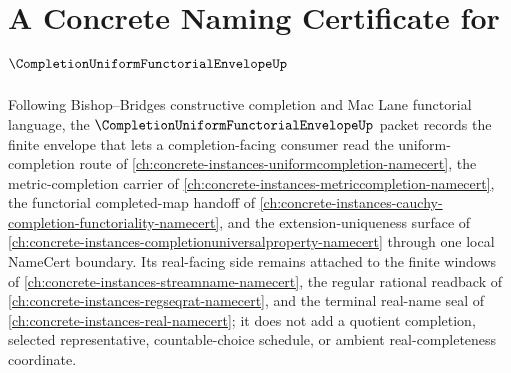 \chapter{A Concrete Naming Certificate for $\CompletionUniformFunctorialEnvelopeUp$}
\label{ch:concrete-instances-completion-uniform-functorial-envelope-namecert}

Following Bishop--Bridges constructive completion and Mac Lane functorial language, the $\CompletionUniformFunctorialEnvelopeUp$ packet records the finite envelope that lets a completion-facing consumer read the uniform-completion route of \autoref{ch:concrete-instances-uniformcompletion-namecert}, the metric-completion carrier of \autoref{ch:concrete-instances-metriccompletion-namecert}, the functorial completed-map handoff of \autoref{ch:concrete-instances-cauchy-completion-functoriality-namecert}, and the extension-uniqueness surface of \autoref{ch:concrete-instances-completionuniversalproperty-namecert} through one local NameCert boundary. Its real-facing side remains attached to the finite windows of \autoref{ch:concrete-instances-streamname-namecert}, the regular rational readback of \autoref{ch:concrete-instances-regseqrat-namecert}, and the terminal real-name seal of \autoref{ch:concrete-instances-real-namecert}; it does not add a quotient completion, selected representative, countable-choice schedule, or ambient real-completeness coordinate.

